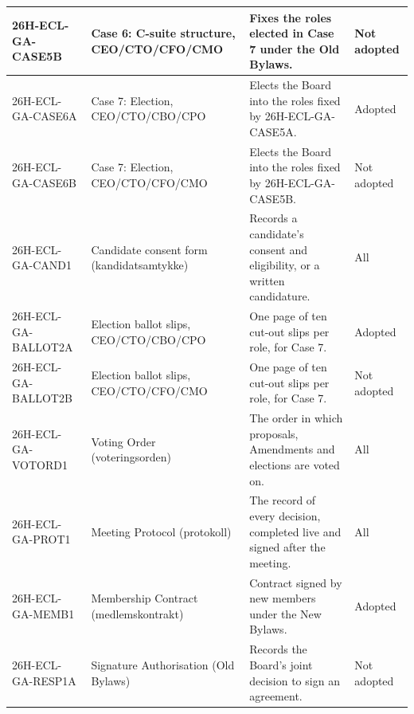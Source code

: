 \documentclass{../../../Common/Latex/Templates/rapport}
\begin{document}
\begin{longtable}{|L{3.2cm}|L{3.6cm}|L{5.3cm}|L{1.9cm}|}
  \hline
  26H-ECL-GA-CASE5B    & Case 6: C-suite structure, CEO/CTO/CFO/CMO & Fixes the roles elected in Case 7 under the Old Bylaws.                                                                      & Not adopted   \\
  \hline
  26H-ECL-GA-CASE6A    & Case 7: Election, CEO/CTO/CBO/CPO          & Elects the Board into the roles fixed by 26H-ECL-GA-CASE5A.                                                                  & Adopted       \\
  \hline
  26H-ECL-GA-CASE6B    & Case 7: Election, CEO/CTO/CFO/CMO          & Elects the Board into the roles fixed by 26H-ECL-GA-CASE5B.                                                                  & Not adopted   \\
  \hline
  26H-ECL-GA-CAND1     & Candidate consent form (kandidatsamtykke)  & Records a candidate's consent and eligibility, or a written candidature.                                                     & All           \\
  \hline
  26H-ECL-GA-BALLOT2A  & Election ballot slips, CEO/CTO/CBO/CPO     & One page of ten cut-out slips per role, for Case 7.                                                                          & Adopted       \\
  \hline
  26H-ECL-GA-BALLOT2B  & Election ballot slips, CEO/CTO/CFO/CMO     & One page of ten cut-out slips per role, for Case 7.                                                                          & Not adopted   \\
  \hline
  26H-ECL-GA-VOTORD1   & Voting Order (voteringsorden)              & The order in which proposals, Amendments and elections are voted on.                                                         & All           \\
  \hline
  26H-ECL-GA-PROT1     & Meeting Protocol (protokoll)               & The record of every decision, completed live and signed after the meeting.                                                   & All           \\
  \hline
  26H-ECL-GA-MEMB1     & Membership Contract (medlemskontrakt)      & Contract signed by new members under the New Bylaws.                                                                         & Adopted       \\
  \hline
  26H-ECL-GA-RESP1A    & Signature Authorisation (Old Bylaws)       & Records the Board's joint decision to sign an agreement.                                                                     & Not adopted   \\

\end{longtable}
\end{document}
